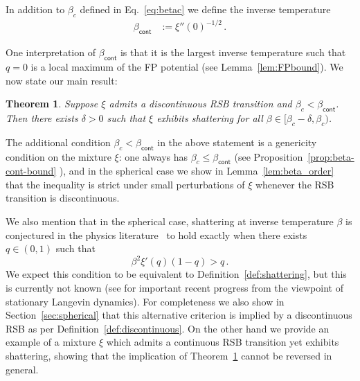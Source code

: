 \documentclass[11pt]{article}
\newtheorem{theorem}{Theorem}[section]
\theoremstyle{definition}
\numberwithin{equation}{section}
\newcommand{\<}{\langle}
\renewcommand{\>}{\rangle}
\def\cont{{\mathsf{cont}}}
\begin{document}
In addition to $\beta_c$ defined in Eq.~\eqref{eq:betac} we define the  inverse temperature
\begin{align}
\beta_{\cont} &:= \xi''(0)^{-1/2}\,. \label{eq:beta_cont}
\end{align}

One interpretation of $\beta_{\cont}$ is that it is the largest inverse temperature such that $q=0$ is a local maximum of the FP potential (see Lemma~\ref{lem:FPbound}). 
%
We now state our main result:
%
\begin{theorem}
\label{thm:main}
Suppose $\xi$ admits a discontinuous RSB transition and $\beta_c < \beta_\cont$. Then there exists $\delta>0$ such that $\xi$ exhibits shattering for all $\beta \in [\beta_c - \delta,\beta_c)$. 
\end{theorem}


The additional condition $\beta_c < \beta_\cont$ in the above statement is a genericity condition on the mixture $\xi$: one always has $\beta_c \le \beta_\cont$ (see Proposition~\ref{prop:beta-cont-bound} ), and in the spherical case we show in Lemma~\ref{lem:beta_order} that the inequality is strict under small perturbations of $\xi$ whenever the RSB transition is discontinuous. 


We also mention that in the spherical case, shattering at inverse temperature $\beta$ is conjectured in the physics literature~\cite{crisanti1993spherical} to hold exactly when there exists $q \in (0,1)$ such that 
\[
\beta^2\xi'(q)(1-q) > q\,.
\]
We expect this condition to be equivalent to Definition~\ref{def:shattering}, but this is currently not known (see \cite[Corollary 2.6]{dembo2025dynamics} for important recent progress from the viewpoint of stationary Langevin dynamics). For completeness we also show in Section~\ref{sec:spherical} that this alternative criterion is implied by a discontinuous RSB as per Definition~\ref{def:discontinuous}. On the other hand we provide an example of a mixture $\xi$ which admits a continuous RSB transition yet exhibits shattering, showing that the implication of Theorem~\ref{thm:main} cannot be reversed in general.      
\end{document}
